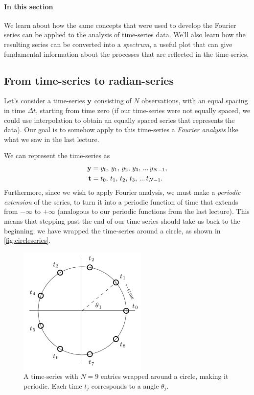 \documentclass[11pt,twoside,a4paper]{article}
\begin{document}
\paragraph{In this section} We learn about how the same concepts that
were used to develop the Fourier series can be applied to the analysis
of time-series data.  We'll also learn how the resulting series can be
converted into a \textit{spectrum}, a useful plot that can give
fundamental information about the processes that are reflected in the
time-series.

\subsection{From time-series to radian-series}

 Let's consider a time-series $\mbox{{\bf y}}$ consisting of
$N$ observations, with an equal spacing in time $\Delta t$, starting
from time zero (if our time-series were not equally spaced, we could
use interpolation to obtain an equally spaced series that represents
the data). Our goal is to somehow apply to this time-series a
\textit{Fourier analysis} like what we saw in the last lecture.

We can represent the time-series as
\begin{align}
  \mbox{{\bf y}} &= y_0,\,y_1,\,y_2,\,y_3,\,...\,y_{N-1},\nonumber\\
  \mbox{{\bf t}} &= t_0,\,t_1,\,t_2,\,t_3,\,...\,t_{N-1}.\nonumber
\end{align}
Furthermore, since we wish to apply Fourier analysis, we must make a
\textit{periodic extension} of the series, to turn it into a periodic
function of time that extends from $-\infty$ to $+\infty$ (analogous
to our periodic functions from the last lecture).  This means that
stepping past the end of our time-series should take us back to the
beginning; we have wrapped the time-series around a circle, as shown
in \autoref{fig:circleseries}.

\begin{figure}
  \centering
  \includegraphics[height=2.5in]{../figs/L15/CircularTimeseries}
  \caption{A time-series with $N=9$ entries wrapped around a circle,
    making it periodic. Each time $t_j$ corresponds to a angle
    $\theta_j$. \vspace{1cm}}
  \label{fig:circleseries}
\end{figure}
\end{document}
